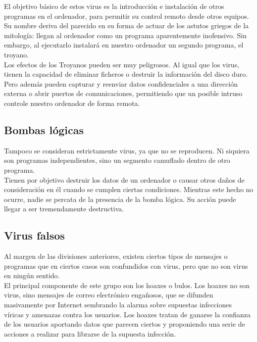 \documentclass[12pt,a4paper]{article}
\begin{document}
	El objetivo básico de estos virus es la introducción e instalación de otros programas en el ordenador, para permitir su control remoto desde otros equipos.\\
	
	Su nombre deriva del parecido en su forma de actuar de los astutos griegos de la mitología: llegan al ordenador como un programa aparentemente inofensivo. Sin embargo, al ejecutarlo instalará en nuestro ordenador un segundo programa, el troyano.\\
	
	Los efectos de los Troyanos pueden ser muy peligrosos. Al igual que los virus, tienen la capacidad de eliminar ficheros o destruir la información del disco duro. Pero además pueden capturar y reenviar datos confidenciales a una dirección externa o abrir puertos de comunicaciones, permitiendo que un posible intruso controle nuestro ordenador de forma remota.
	
	\subsection{Bombas lógicas}
	Tampoco se consideran estrictamente virus, ya que no se reproducen. Ni siquiera son programas independientes, sino un segmento camuflado dentro de otro programa.\\
	
	Tienen por objetivo destruir los datos de un ordenador o causar otros daños de consideración en él cuando se cumplen ciertas condiciones. Mientras este hecho no ocurre, nadie se percata de la presencia de la bomba lógica. Su acción puede llegar a ser tremendamente destructiva.
	
	\subsection{Virus falsos}
	Al margen de las divisiones anteriores, existen ciertos tipos de mensajes o programas que en ciertos casos son confundidos con virus, pero que no son virus en ningún sentido.\\
	
	El principal componente de este grupo son los hoaxes o bulos. Los hoaxes no son virus, sino mensajes de correo electrónico engañosos, que se difunden masivamente por Internet sembrando la alarma sobre supuestas infecciones víricas y amenazas contra los usuarios.
	Los hoaxes tratan de ganarse la confianza de los usuarios aportando datos que parecen ciertos y proponiendo una serie de acciones a realizar para librarse de la supuesta infección.\\
	
\end{document}
